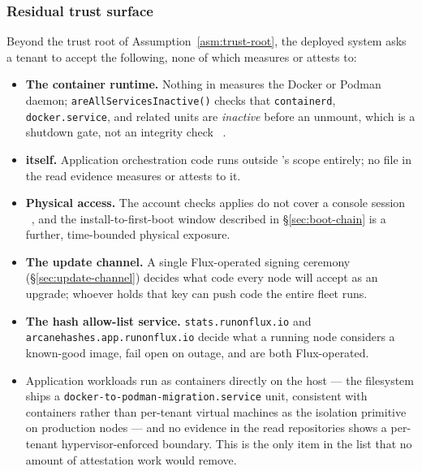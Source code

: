 \subsubsection{Residual trust surface}

Beyond the trust root of Assumption~\ref{asm:trust-root}, the deployed system asks a tenant to
accept the following, none of which \fluxsas measures or attests to:
\begin{itemize}
  \item \textbf{The container runtime.} Nothing in \fluxsas measures the Docker or Podman daemon;
  \texttt{are\allowbreak{}All\allowbreak{}Services\allowbreak{}Inactive()} checks that \texttt{containerd}, \texttt{docker.service}, and
  related units are \emph{inactive} before an unmount, which is a shutdown gate, not an integrity
  check \shipped~.
  \item \textbf{\FluxOS itself.} Application orchestration code runs outside \fluxsas's scope
  entirely; no file in the read evidence measures or attests to it.
  \item \textbf{Physical access.} The account checks \fluxsas{} applies do not cover a console
  session \shipped~, and the install-to-first-boot window described in \S\ref{sec:boot-chain} is a
  further, time-bounded physical exposure.
  \item \textbf{The update channel.} A single Flux-operated signing ceremony
  (\S\ref{sec:update-channel}) decides what code every node will accept as an upgrade; whoever
  holds that key can push code the entire fleet runs.
  \item \textbf{The hash allow-list service.} \texttt{stats.\allowbreak{}runonflux.\allowbreak{}io} and
  \texttt{arcanehashes.\allowbreak{}app.\allowbreak{}runonflux.\allowbreak{}io} decide what a running node considers a known-good image,
  fail open on outage, and are both Flux-operated.
  \item {} Application workloads run as
  containers directly on the \ArcaneOS host — the filesystem ships a
  \texttt{docker-to-podman-migration.\allowbreak{}service} unit, consistent with containers rather than
  per-tenant virtual machines as the isolation primitive on production nodes — and no evidence in
  the read repositories shows a per-tenant hypervisor-enforced boundary\srcinferred. This is the only
  item in the list that no amount of attestation work would remove.
\end{itemize}

